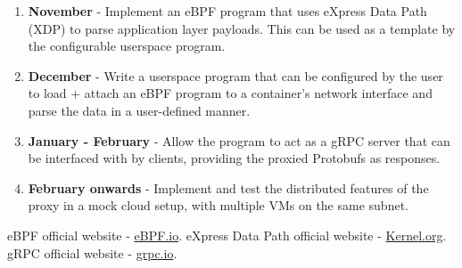 \documentclass[12pt]{article}
\begin{document}
\begin{enumerate}
    \item \textbf{November} - Implement an eBPF \cite{ebpf} program that uses eXpress Data Path (XDP) \cite{xdp} to parse application layer payloads. This can be used as a template by the configurable userspace program.
    \item \textbf{December} - Write a userspace program that can be configured by the user to load + attach an eBPF program to a container's network interface and parse the data in a user-defined manner.
    \item \textbf{January - February} - Allow the program to act as a gRPC \cite{grpc} server that can be interfaced with by clients, providing the proxied Protobufs as responses.
    \item \textbf{February onwards} - Implement and test the distributed features of the proxy in a mock cloud setup, with multiple VMs on the same subnet.
\end{enumerate}

\begin{thebibliography}{9}
        eBPF official website - \href{http://ebpf.io}{eBPF.io}.
        eXpress Data Path official website - \href{https://www.kernel.org/doc/Documentation/networking/x_tables.txt}{Kernel.org}.
        gRPC official website - \href{https://grpc.io}{grpc.io}.
\end{thebibliography}
\end{document}

